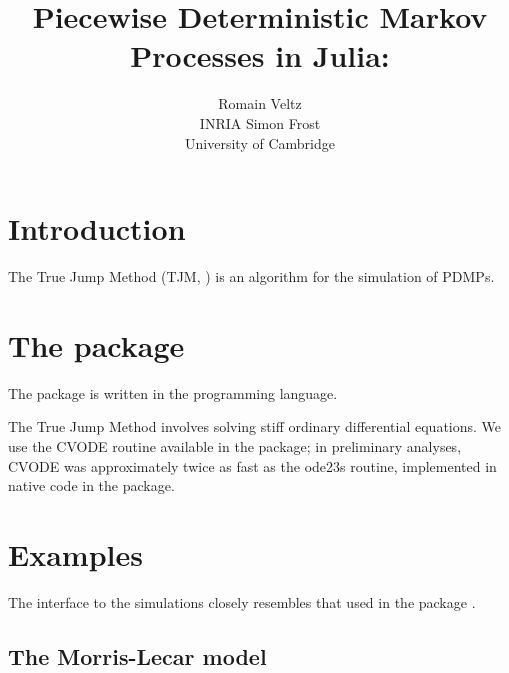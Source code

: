 \documentclass[article]{jss}
\author{Romain Veltz\\INRIA \And
        Simon Frost\\University of Cambridge}
\title{Piecewise Deterministic Markov Processes in Julia: \pkg{PDMP.jl}}
\begin{document}


\section[Introduction]{Introduction}

The True Jump Method (TJM, \cite{Veltz2015}) is an algorithm for the simulation of PDMPs.

\section[The PDMP.jl package]{The  package}

The  package is written in the  programming language.

The True Jump Method involves solving stiff ordinary differential equations. We use the CVODE routine available in the  package; in preliminary analyses, CVODE was approximately twice as fast as the ode23s routine, implemented in native  code in the  package.

\section[Examples]{Examples}

The interface to the simulations closely resembles that used in the  package  \citep{Pineda-Krch2008}.

\subsection[The Morris-Lecar model]{The Morris-Lecar model}
\end{document}
